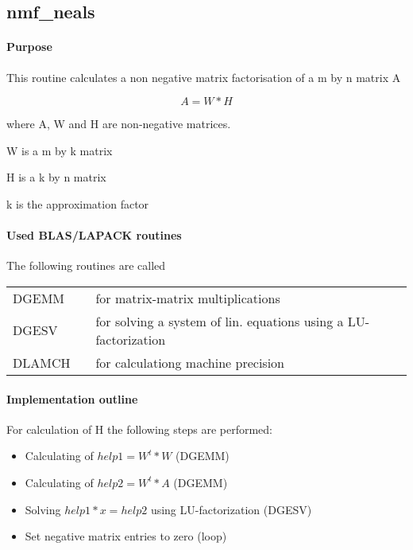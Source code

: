 \documentclass[a4paper,10pt]{scrartcl}
\begin{document}
		\subsection{nmf\_neals}

			\paragraph{Purpose}

					This routine calculates a non negative matrix factorisation of a m by n 
					matrix A\newline
					
					\begin{equation*}
						A = W * H
					\end{equation*}

 					where A, W and H are non-negative matrices.

 					W is a m by k matrix

 					H is a k by n matrix

 					k is the approximation factor


			\paragraph{Used BLAS/LAPACK routines}

					The following routines are called\newline

					\begin{tabular}{lcl}
						DGEMM && for matrix-matrix multiplications\\
						DGESV && for solving a system of lin. equations using a 
							LU-factorization\\
						DLAMCH && for calculationg machine precision
					\end{tabular}

			\paragraph{Implementation outline}


					For calculation of H the following steps are performed:\newline

					\begin{itemize}
					 \item Calculating of $help1 = W^t * W$ (DGEMM)\newline
					 \item Calculating of $help2 = W^t * A$ (DGEMM)\newline
					 \item Solving $help1 * x = help2$ using LU-factorization (DGESV)\newline
					 \item Set negative matrix entries to zero (loop)\newline
					\end{itemize}
\end{document}
